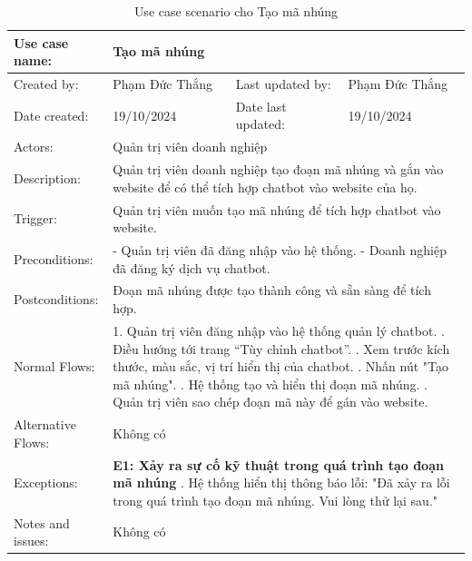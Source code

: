 \begin{table}[H]
\centering
\begin{tabular}{|l|l|l|l|}
\hline
Use case name: & \multicolumn{3}{|l|}{Tạo mã nhúng} \\
\hline
Created by: & Phạm Đức Thắng & Last updated by: & Phạm Đức Thắng \\
\hline
Date created: & 19/10/2024 & Date last updated: & 19/10/2024 \\
\hline
Actors: & \multicolumn{3}{|l|}{Quản trị viên doanh nghiệp} \\
\hline
Description: & \multicolumn{3}{|p{12cm}|}{Quản trị viên doanh nghiệp tạo đoạn mã nhúng và gắn vào website để có thể tích hợp chatbot vào website của họ.} \\
\hline
Trigger: & \multicolumn{3}{|p{12cm}|}{Quản trị viên muốn tạo mã nhúng để tích hợp chatbot vào website.} \\
\hline
Preconditions: & \multicolumn{3}{|p{12cm}|}{
- Quản trị viên đã đăng nhập vào hệ thống. \newline
- Doanh nghiệp đã đăng ký dịch vụ chatbot.
} \\
\hline
Postconditions: & \multicolumn{3}{|p{12cm}|}{Đoạn mã nhúng được tạo thành công và sẵn sàng để tích hợp.} \\
\hline
Normal Flows: & \multicolumn{3}{|p{12cm}|}{
1. Quản trị viên đăng nhập vào hệ thống quản lý chatbot. \newline
2. Điều hướng tới trang “Tùy chỉnh chatbot”. \newline
3. Xem trước kích thước, màu sắc, vị trí hiển thị của chatbot. \newline
4. Nhấn nút "Tạo mã nhúng". \newline
5. Hệ thống tạo và hiển thị đoạn mã nhúng. \newline
6. Quản trị viên sao chép đoạn mã này để gán vào website.
}\\
\hline
Alternative Flows: & \multicolumn{3}{|p{12cm}|}{Không có} \\
\hline
Exceptions: & \multicolumn{3}{|p{12cm}|}{
\textbf{E1: Xảy ra sự cố kỹ thuật trong quá trình tạo đoạn mã nhúng} \newline
5.1. Hệ thống hiển thị thông báo lỗi: "Đã xảy ra lỗi trong quá trình tạo đoạn mã nhúng. Vui lòng thử lại sau."
} \\
\hline
Notes and issues: & \multicolumn{3}{|p{12cm}|}{Không có} \\
\hline
\end{tabular}
\caption{Use case scenario cho Tạo mã nhúng}
\end{table}

